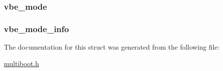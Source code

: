 \label{structmultiboot_a107829766e01a5c0f724f78284b84310}
\hypertarget{structmultiboot_aaca371d7e671a0f6da3fe7f9786a49df}{
\subsubsection[{vbe\_\-mode}]{ {\bf vbe\_\-mode}}}
\label{structmultiboot_aaca371d7e671a0f6da3fe7f9786a49df}
\hypertarget{structmultiboot_abfceba4fe6886ce70184ca01f67155cc}{
\subsubsection[{vbe\_\-mode\_\-info}]{ {\bf vbe\_\-mode\_\-info}}}
\label{structmultiboot_abfceba4fe6886ce70184ca01f67155cc}


The documentation for this struct was generated from the following file:\begin{DoxyCompactItemize}
\item 
\hyperlink{multiboot_8h}{multiboot.h}\end{DoxyCompactItemize}
